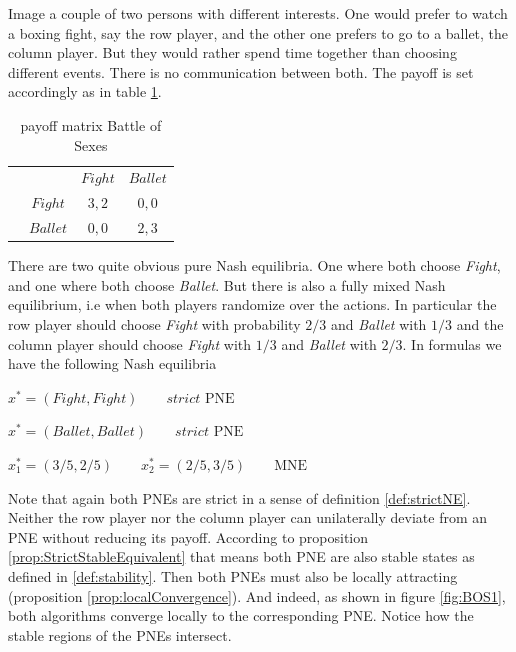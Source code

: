 Image a couple of two persons with different interests. One would prefer to watch a boxing fight, say the row player, and the other one prefers to go to a ballet, the column player. But they would rather spend time together than choosing different events. There is no communication between both. The payoff is set accordingly as in table \ref{tab:payoffBattleOfSexes}.

\begin{table}[H]\centering
\setlength{\extrarowheight}{2pt}
\begin{tabular}{cc|c|c|}
  & \multicolumn{1}{c}{} & \multicolumn{1}{c}{$Fight$}  & \multicolumn{1}{c}{$Ballet$} \\\cline{3-4}
  & $Fight$ & $3,2$ & $0,0$ \\\cline{3-4}
  & $Ballet$ & $0,0$ & $2,3$ \\\cline{3-4}
\end{tabular}\caption{\label{tab:payoffBattleOfSexes}payoff matrix Battle of Sexes}
\end{table}

There are two quite obvious pure Nash equilibria. One where both choose \textit{Fight}, and one where both choose \textit{Ballet}. But there is also a fully mixed Nash equilibrium, i.e when both players randomize over the actions. In particular the row player should choose \textit{Fight} with probability $2/3$ and \textit{Ballet} with $1/3$ and the column player should choose \textit{Fight} with $1/3$ and \textit{Ballet} with $2/3$. In formulas we have the following Nash equilibria

\begin{description}\centering
    \item $x^{*} = (Fight,Fight) \qquad \textit{strict }\text{PNE}$
    \item $x^{*} = (Ballet,Ballet) \qquad \textit{strict }\text{PNE}$
    \item $x_{1}^* = (3/5,2/5) \qquad x_{2}^* = (2/5,3/5) \qquad \text{MNE}$
\end{description}

Note that again both PNEs are strict in a sense of definition \ref{def:strictNE}. Neither the row player nor the column player can unilaterally deviate from an PNE without reducing its payoff. According to proposition \ref{prop:StrictStableEquivalent} that means both PNE are also stable states as defined in \ref{def:stability}. Then both PNEs must also be locally attracting (proposition \ref{prop:localConvergence}). And indeed, as shown in figure \ref{fig:BOS1}, both algorithms converge locally to the corresponding PNE. Notice how the stable regions of the PNEs intersect.

